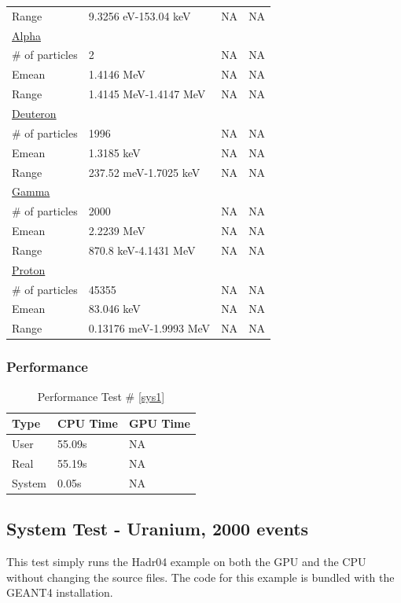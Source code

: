 \documentclass[12pt]{article}
\begin{document}
\begin{table}[!htbp]
\begin{tabular}{llll}
		Range&9.3256 eV-153.04 keV&NA&NA\\
		\underline{Alpha}&&&\\
		\# of particles&2&NA&NA\\
		Emean&1.4146 MeV&NA&NA\\
		Range&1.4145 MeV-1.4147 MeV&NA&NA\\
		\underline{Deuteron}&&&\\
		\# of particles&1996&NA&NA\\
		Emean&1.3185 keV&NA&NA\\
		Range&237.52 meV-1.7025 keV&NA&NA\\
		\underline{Gamma}&&&\\
		\# of particles&2000&NA&NA\\
		Emean&2.2239 MeV&NA&NA\\
		Range&870.8 keV-4.1431 MeV&NA&NA\\
		\underline{Proton}&&&\\
		\# of particles&45355&NA&NA\\
		Emean&83.046 keV&NA&NA\\
		Range&0.13176 meV-1.9993 MeV&NA&NA\\
		\end{tabular}
		\end{table}
		\break
	\subsubsection{Performance}
		\begin{table}[!htbp]
		\centering
		\caption{Performance Test \# \ref{sys1}}\label{_acc}
		\begin{tabular}{lll}
		\toprule
		Type&CPU Time& GPU Time\\\midrule
		User&55.09s&NA\\
		Real&55.19s&NA\\
		System&0.05s&NA\\
		\end{tabular}
		\end{table}
\break
\subsection{System Test - Uranium, 2000 events}
This test simply runs the Hadr04 example on both the GPU and the CPU without changing the source files. The code for this example is bundled with the GEANT4 installation.\\
\end{document}
